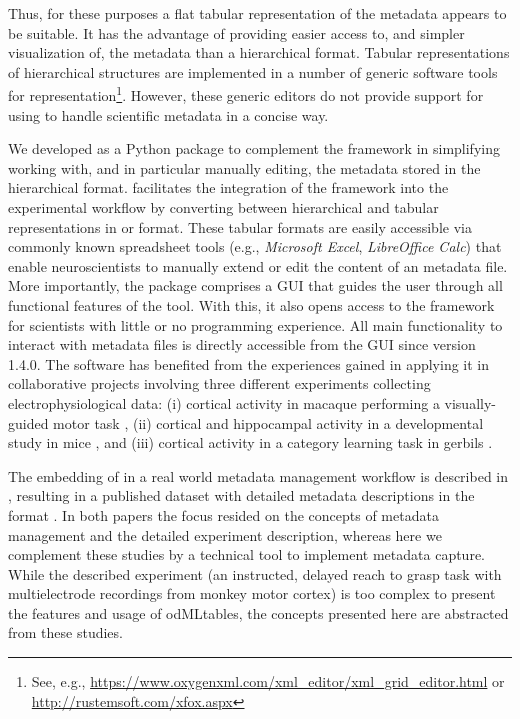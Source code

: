 Thus, for these purposes a flat tabular representation of the metadata appears to be suitable. It has the advantage of providing easier access to, and simpler visualization of, the metadata than a hierarchical format. Tabular representations of hierarchical structures are implemented in a number of generic software tools for  representation\footnote{See, e.g., \url{https://www.oxygenxml.com/xml\_editor/xml\_grid\_editor.html} or \url{http://rustemsoft.com/xfox.aspx}}. However, these generic  editors do not provide support for using  to handle scientific metadata in a concise way.

We developed  as a Python package to complement the  framework in simplifying working with, and in particular manually editing, the metadata stored in the hierarchical  format.  facilitates the integration of the  framework into the experimental workflow by converting between hierarchical  and tabular representations in  or  format. These tabular formats are easily accessible via commonly known spreadsheet tools (e.g., \textit{Microsoft Excel}, \textit{LibreOffice Calc}) that enable neuroscientists to manually extend or edit the content of an  metadata file. More importantly, the  package comprises a GUI that guides the user through all functional features of the tool. With this, it also opens access to the  framework for scientists with little or no programming experience. All main functionality to interact with metadata files is directly accessible from the  GUI since version 1.4.0. The software has benefited from the experiences gained in applying it in collaborative projects involving three different experiments collecting electrophysiological data: (i) cortical activity in macaque performing a visually-guided motor task \citep[e.g.,][]{Denker_2018,Brochier_2018}, (ii) cortical and hippocampal activity in a developmental study in mice \citep[e.g.,][]{Bitzenhofer_2017}, and (iii) cortical activity in a category learning task in gerbils \citep[e.g.,][]{Ohl_2001}.


The embedding of  in a real world metadata management workflow is described in \cite{Zehl_2016}, resulting in a published dataset with detailed metadata descriptions in the  format  \citep{Brochier_2018}. In both papers the focus resided on the concepts of metadata management and the detailed experiment description, whereas here we complement these studies by a technical tool to implement metadata capture. While the described experiment (an instructed, delayed reach to grasp task with multielectrode recordings from monkey motor cortex) is too complex to present the features and usage of odMLtables, the concepts presented here are abstracted from these studies.

